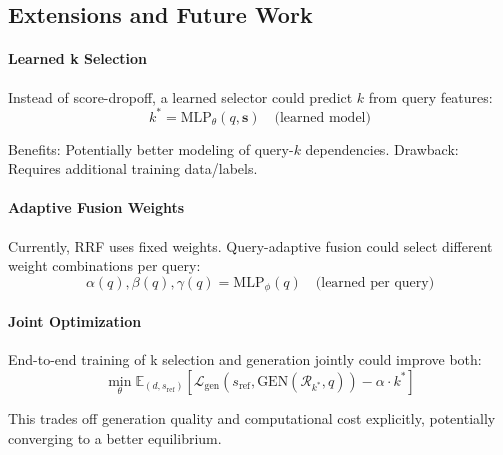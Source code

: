 \subsection*{Extensions and Future Work}

\paragraph{Learned k Selection}
Instead of score-dropoff, a learned selector could predict $k$ from query features:
\begin{equation}
k^* = \text{MLP}_\theta(q, \mathbf{s}) \quad \text{(learned model)}
\end{equation}

Benefits: Potentially better modeling of query-$k$ dependencies. Drawback: Requires additional training data/labels.

\paragraph{Adaptive Fusion Weights}
Currently, RRF uses fixed weights. Query-adaptive fusion could select different weight combinations per query:
\begin{equation}
\alpha(q), \beta(q), \gamma(q) = \text{MLP}_\phi(q) \quad \text{(learned per query)}
\end{equation}

\paragraph{Joint Optimization}
End-to-end training of k selection and generation jointly could improve both:
\begin{equation}
\min_{\theta} \mathbb{E}_{(d,s_{\text{ref}})} [\mathcal{L}_{\text{gen}}(s_{\text{ref}}, \text{GEN}(\mathcal{R}_{k^*}, q)) - \alpha \cdot k^*]
\end{equation}

This trades off generation quality and computational cost explicitly, potentially converging to a better equilibrium.
